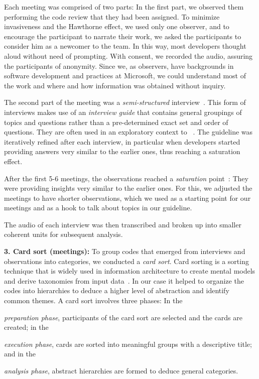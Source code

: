 Each meeting was comprised of two parts: In the first part, we observed them
performing the code review that they had been assigned. To minimize
invasiveness and the Hawthorne effect, we used only one observer, and to encourage the participant to
narrate their work, we asked the participants to consider him as a newcomer to
the team. In this way, most developers thought aloud without need of prompting.
With consent, we recorded the audio, assuring the participants of anonymity.
Since we, as observers, have backgrounds in software development and practices
at Microsoft, we could understand most of the work and where and how
information was obtained without inquiry. 

The second part of the meeting was a \emph{semi-structured} interview~\cite{taylor2010qualitative}. This form of interviews makes use of an \emph{interview guide} that
contains general groupings of topics and questions rather than a pre-determined
exact set and order of questions.  They are often used in an exploratory
context to ~\cite{weiss1995learning}. 
The guideline was iteratively refined after each interview, in
particular when developers started providing answers very similar to the
earlier ones, thus reaching a saturation effect.

After the first 5-6 meetings, the observations reached a \emph{saturation} point~\cite{Glas1998a}: They were providing insights very similar to the earlier ones. For this, we adjusted the meetings to have shorter observations, which we used as a starting point for our meetings and as a hook to talk about topics in our guideline.

The audio of each interview was then transcribed and broken up into smaller
coherent units for subsequent analysis.

\textbf{3. Card sort (meetings):} To group codes that emerged from interviews and
observations into categories, we conducted a \emph{card sort}. Card sorting is a
sorting technique that is widely used in information architecture to create
mental models and derive taxonomies from input data~\cite{barker2005online}. In our case
it helped to organize the codes into hierarchies to deduce a higher level of
abstraction and identify common themes. A card sort involves three phases: In
the \begin{inparaenum}[(1)]
\item \emph{preparation phase}, participants of the card sort are selected and the
cards are created; in the 
\item \emph{execution phase}, cards are sorted into meaningful
groups with a descriptive title; and in the 
\item \emph{analysis phase}, abstract hierarchies are formed to deduce general categories.
\end{inparaenum}

